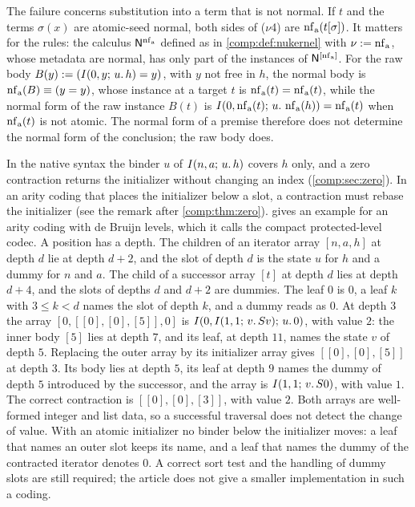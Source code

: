 The failure concerns substitution into a term that is not normal. If $t$ and
the terms $\sigma(x)$ are atomic-seed normal, both sides of ($\nu$4) are
$\operatorname{nf}_{\mathrm a}(t[\sigma])$. It matters for the rules: the calculus
$\mathsf{N}^{\operatorname{nf}_{\mathrm a}}$ defined as in \cref{comp:def:nukernel} with
$\nu\mathrel{:=}\operatorname{nf}_{\mathrm a}$, whose metadata are normal, has only part of the
instances of $\mathsf{N}^{[\operatorname{nf}_{\mathrm a}]}$. For the raw body $B(y)\mathrel{:=}(I(0,y;\,u.\,h)=y)$,
with $y$ not free in $h$, the normal body is $\operatorname{nf}_{\mathrm a}(B)\equiv(y=y)$,
whose instance at a target $t$ is $\operatorname{nf}_{\mathrm a}(t)=\operatorname{nf}_{\mathrm a}(t)$,
while the normal form of the raw instance $B(t)$ is
$I(0,\operatorname{nf}_{\mathrm a}(t);\,u.\,\operatorname{nf}_{\mathrm a}(h))=\operatorname{nf}_{\mathrm a}(t)$ when
$\operatorname{nf}_{\mathrm a}(t)$ is not atomic. The normal form of a premise therefore
does not determine the normal form of the conclusion; the raw body does.

\begin{remark}
\label{comp:rem:rebasing}
In the native syntax the binder $u$ of $I(n,a;\,u.\,h)$ covers $h$ only,
and a zero contraction returns the initializer without changing an index
(\cref{comp:sec:zero}). In an arity coding that places the initializer below
a slot, a contraction must rebase the initializer (see the remark after
\cref{comp:thm:zero}).  gives an example for an
arity coding with de Bruijn levels, which it calls the compact
protected-level codec. A position has a depth. The children of an iterator array
$[n,a,h]$ at depth $d$ lie at depth $d+2$, and the slot of depth $d$ is the
state $u$ for $h$ and a dummy for $n$ and $a$. The child of a successor array
$[t]$ at depth $d$ lies at depth $d+4$, and the slots of depths $d$ and $d+2$
are dummies. The leaf $0$ is $0$, a leaf $k$ with $3\le k<d$ names the slot
of depth $k$, and a dummy reads as $0$. At depth $3$ the array
$[0,[[0],[0],[5]],0]$ is $I(0,I(1,1;\,v.\,S v);\,u.\,0)$, with value
$2$: the inner body $[5]$ lies at depth $7$, and its leaf, at depth $11$,
names the state $v$ of depth $5$. Replacing the outer array by its
initializer array gives $[[0],[0],[5]]$ at depth $3$. Its body lies at depth
$5$, its leaf at depth $9$ names the dummy of depth $5$ introduced by the
successor, and the array is $I(1,1;\,v.\,S0)$, with value $1$. The
correct contraction is $[[0],[0],[3]]$, with value $2$. Both arrays are
well-formed integer and list data, so a successful traversal does not detect
the change of value. With an atomic initializer no binder below the
initializer moves: a leaf that names an outer slot keeps its name, and a leaf
that names the dummy of the contracted iterator denotes $0$. A correct sort
test and the handling of dummy slots are still required; the article does
not give a smaller implementation in such a coding.
\end{remark}

